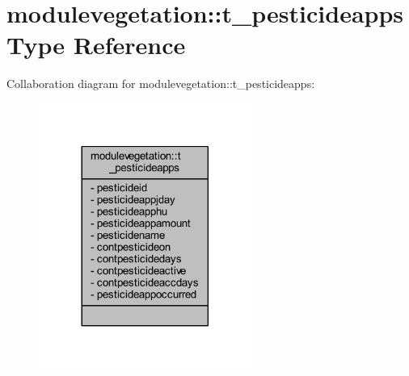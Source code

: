 \hypertarget{structmodulevegetation_1_1t__pesticideapps}{}\section{modulevegetation\+:\+:t\+\_\+pesticideapps Type Reference}
\label{structmodulevegetation_1_1t__pesticideapps}


Collaboration diagram for modulevegetation\+:\+:t\+\_\+pesticideapps\+:\nopagebreak
\begin{figure}[H]
\begin{center}
\leavevmode
\includegraphics[width=197pt]{structmodulevegetation_1_1t__pesticideapps__coll__graph}
\end{center}
\end{figure}
